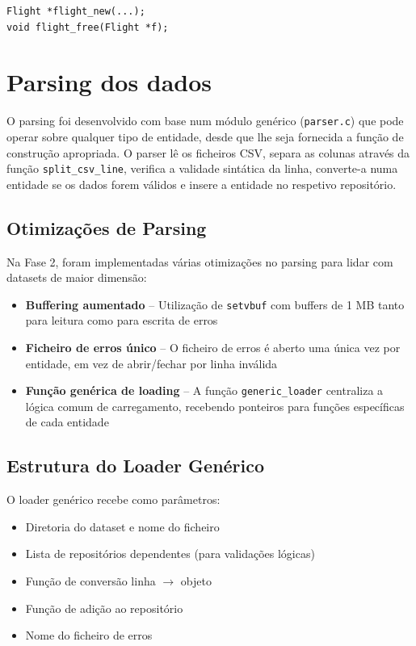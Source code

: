 \documentclass[a4paper,12pt]{scrreprt}
\begin{document}
\begin{lstlisting}
Flight *flight_new(...);
void flight_free(Flight *f);
\end{lstlisting}


\section{Parsing dos dados}

O parsing foi desenvolvido com base num módulo genérico (\texttt{parser.c}) que pode operar sobre qualquer tipo de entidade, desde que lhe seja fornecida a função de construção apropriada. O parser lê os ficheiros CSV, separa as colunas através da função \texttt{split\_csv\_line}, verifica a validade sintática da linha, converte-a numa entidade se os dados forem válidos e insere a entidade no respetivo repositório.

\subsection{Otimizações de Parsing}

Na Fase 2, foram implementadas várias otimizações no parsing para lidar com datasets de maior dimensão:

\begin{itemize}
    \item \textbf{Buffering aumentado} -- Utilização de \texttt{setvbuf} com buffers de 1 MB tanto para leitura como para escrita de erros
    \item \textbf{Ficheiro de erros único} -- O ficheiro de erros é aberto uma única vez por entidade, em vez de abrir/fechar por linha inválida
    \item \textbf{Função genérica de loading} -- A função \texttt{generic\_loader} centraliza a lógica comum de carregamento, recebendo ponteiros para funções específicas de cada entidade
\end{itemize}

\subsection{Estrutura do Loader Genérico}

O loader genérico recebe como parâmetros:
\begin{itemize}
    \item Diretoria do dataset e nome do ficheiro
    \item Lista de repositórios dependentes (para validações lógicas)
    \item Função de conversão linha $\rightarrow$ objeto
    \item Função de adição ao repositório
    \item Nome do ficheiro de erros
\end{itemize}
\end{document}
